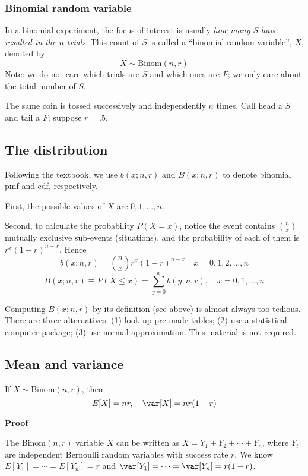 \documentclass[12pt]{article}
\begin{document}
\subsubsection{Binomial random variable}

In a binomial experiment, the focus of interest is usually
\emph{how many $S$ have resulted in the $n$ trials}.
This count of $S$ is called a ``binomial random variable'', $X$,
denoted by
\[
X \sim \text{Binom}(n, r)
\]
Note: we do not care which trials are $S$ and which ones are $F$;
we only care about the total number of $S$.

\example
The same coin is tossed successively and independently $n$ times.
Call head a $S$ and tail a $F$; suppose $r = .5$.

\subsection{The distribution}

Following the textbook, we use
$b(x; n, r)$ and $B(x; n, r)$ to denote binomial
pmf and cdf, respectively.

First, the possible values of $X$ are $0, 1,\dotsc, n$.

Second, to calculate the probability $P(X = x)$, notice the event
contains $n\choose x$ mutually exclusive sub-events (situations),
and the probability of each of them is $r^x (1-r)^{n-x}$.
Hence
\[
b(x; n, r)
= {n\choose x} r^x (1-r)^{n-x} \quad x=0,1,2,\dotsc,n
\]
\[
B(x; n, r)
\equiv P(X \le x)
= \sum_{y=0}^x b(y; n, r),
\quad x=0,1,\dotsc,n
\]

Computing $B(x; n,r)$ by its definition (see above)
is almost always too tedious.
There are three alternatives:
(1) look up pre-made tables;
(2) use a statistical computer package;
(3) use normal approximation.
This material is not required.

\subsection{Mean and variance}

If $X \sim \text{Binom}(n,r)$, then
\[
E[X] = nr,\quad
\var[X] = nr(1-r)
\]

\textbf{Proof}

The $\text{Binom}(n,r)$ variable $X$ can be written as
$X = Y_1 + Y_2 + \dotsb + Y_n$, where $Y_i$ are independent
Bernoulli random variables with success rate $r$.
We know $E[Y_1]=\dotsb=E[Y_n] = r$ and
$\var[Y_1]=\dotsb=\var[Y_n] = r(1-r)$.
\end{document}
